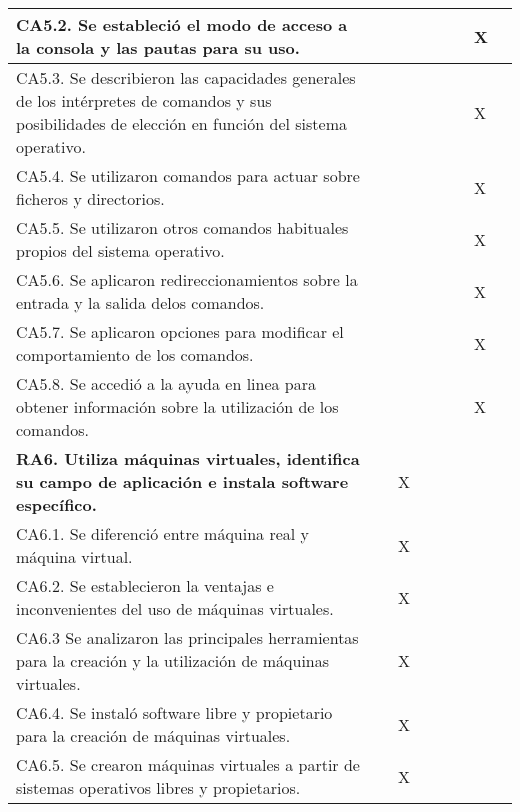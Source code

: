 \documentclass[a4paper,oneside,titlepage,12pt]{article}
\begin{document}
\begin{tabularx}{\textwidth}{| X | M{0.5cm} | M{0.5cm} | M{0.5cm} | M{0.5cm} | M{0.5cm} | M{0.5cm} | m{5cm} |}
    \quad CA5.2. Se estableció el modo de acceso a la consola y las pautas para su uso. &  &  &  &  &  & X & \\\hline
    
    \quad CA5.3. Se describieron las capacidades generales de los intérpretes de comandos y sus posibilidades de elección en función del sistema operativo. &  &  &  &  &   & X & \\\hline
    
    \quad CA5.4. Se utilizaron comandos para actuar sobre ficheros y directorios. &  &  &  &  &  & X & \\\hline
    
    \quad CA5.5. Se utilizaron otros comandos habituales propios del sistema operativo. &  &  &  &  &  & X & \\\hline
    
    \quad CA5.6. Se aplicaron redireccionamientos sobre la entrada y la salida delos comandos. &  &  &  &  &  & X & \\\hline
    
    \quad CA5.7. Se aplicaron opciones para modificar el comportamiento de los comandos. &  &  &  &  &  & X & \\\hline
    
    \quad CA5.8. Se accedió a la ayuda en linea para obtener información sobre la utilización de los comandos. &  &  &  &  &  & X & \\\hline
    
    \textbf{RA6. Utiliza máquinas virtuales, identifica su campo de aplicación e instala software específico.} &  & X &  &  &  &  & \\\hline
    
    \quad CA6.1. Se diferenció entre máquina real y máquina virtual. &  & X &  &  &  &  & \\\hline
    
    \quad CA6.2. Se establecieron la ventajas e inconvenientes del uso de máquinas virtuales. &  & X &  &  &  &  & \\\hline
    
    \quad CA6.3 Se analizaron las principales herramientas para la creación y la utilización de máquinas virtuales. &  & X &  &  &  &  & \\\hline
    
    \quad CA6.4. Se instaló software libre y propietario para la creación de máquinas virtuales. &  & X &  &  &  &  & \\\hline
    
    \quad CA6.5. Se crearon máquinas virtuales a partir de sistemas operativos libres y propietarios. &  & X &  &  &  &  & \\\hline
    

\end{tabularx}
\end{document}
